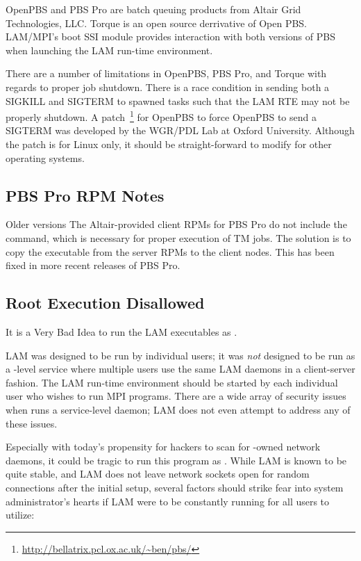 OpenPBS and PBS Pro are batch queuing products from Altair Grid
Technologies, LLC.  Torque is an open source derrivative of Open PBS.
LAM/MPI's  boot SSI module provides interaction with both
versions of PBS when launching the LAM run-time environment.

There are a number of limitations in OpenPBS, PBS Pro, and Torque with
regards to proper job shutdown.  There is a race condition in sending
both a SIGKILL and SIGTERM to spawned tasks such that the LAM RTE may
not be properly shutdown.  A
patch~\footnote{\url{http://bellatrix.pcl.ox.ac.uk/~ben/pbs/}} for
OpenPBS to force OpenPBS to send a SIGTERM was developed by the
WGR/PDL Lab at Oxford University.  Although the patch is for Linux
only, it should be straight-forward to modify for other operating
systems.


\subsection{PBS Pro RPM Notes}

Older versions The Altair-provided client RPMs for PBS Pro do not
include the  command, which is necessary for proper
execution of TM jobs.  The solution is to copy the executable from the
server RPMs to the client nodes.  This has been fixed in more recent
releases of PBS Pro.



\subsection{Root Execution Disallowed}
  
It is a Very Bad Idea to run the LAM executables as .
  
LAM was designed to be run by individual users; it was {\em not}
designed to be run as a -level service where multiple users
use the same LAM daemons in a client-server fashion.  The LAM run-time
environment should be started by each individual user who wishes to
run MPI programs.  There are a wide array of security issues when
 runs a service-level daemon; LAM does not even attempt to
address any of these issues.
  
Especially with today's propensity for hackers to scan for
-owned network daemons, it could be tragic to run this
program as .  While LAM is known to be quite stable, and
LAM does not leave network sockets open for random connections after
the initial setup, several factors should strike fear into system
administrator's hearts if LAM were to be constantly running for all
users to utilize:

